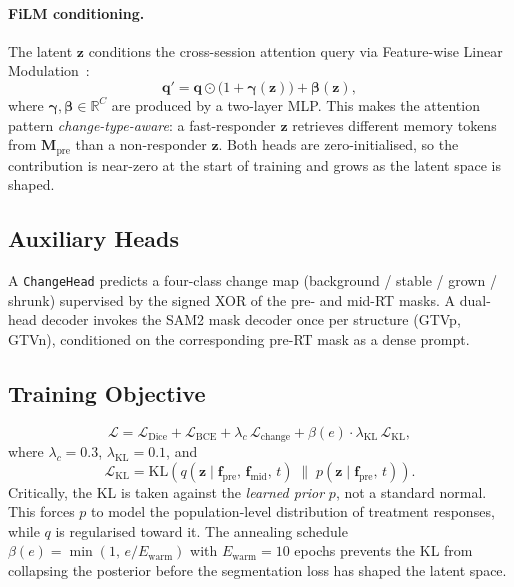 \paragraph{FiLM conditioning.}
The latent $\mathbf{z}$ conditions the cross-session attention query via
Feature-wise Linear Modulation~\cite{perez2018film}:
\begin{equation}
  \mathbf{q}' = \mathbf{q} \odot \bigl(1 + \boldsymbol{\gamma}(\mathbf{z})\bigr)
              + \boldsymbol{\beta}(\mathbf{z}),
\end{equation}
where $\boldsymbol{\gamma}, \boldsymbol{\beta} \in \mathbb{R}^C$ are produced
by a two-layer MLP.  This makes the attention pattern \emph{change-type-aware}:
a fast-responder $\mathbf{z}$ retrieves different memory tokens from
$\mathbf{M}_{\text{pre}}$ than a non-responder $\mathbf{z}$.  Both heads are
zero-initialised, so the contribution is near-zero at the start of training
and grows as the latent space is shaped.

\subsection{Auxiliary Heads}
\label{sec:method:auxiliary}

A \texttt{ChangeHead} predicts a four-class change map
(background / stable / grown / shrunk) supervised by the signed XOR of the
pre- and mid-RT masks.  A dual-head decoder invokes the SAM2 mask decoder
once per structure (GTVp, GTVn), conditioned on the corresponding pre-RT mask
as a dense prompt.

\subsection{Training Objective}
\label{sec:method:loss}

\begin{equation}
  \mathcal{L} =
    \mathcal{L}_{\text{Dice}} + \mathcal{L}_{\text{BCE}}
    + \lambda_c\, \mathcal{L}_{\text{change}}
    + \beta(e)\cdot\lambda_{\text{KL}}\, \mathcal{L}_{\text{KL}},
\end{equation}
where $\lambda_c = 0.3$, $\lambda_{\text{KL}} = 0.1$, and
\begin{equation}
  \mathcal{L}_{\text{KL}} = \mathrm{KL}\!\left(
    q(\mathbf{z} \mid \mathbf{f}_{\text{pre}},\, \mathbf{f}_{\text{mid}},\, t)
    \;\|\;
    p(\mathbf{z} \mid \mathbf{f}_{\text{pre}},\, t)
  \right).
\end{equation}
Critically, the KL is taken against the \emph{learned prior} $p$, not a
standard normal.  This forces $p$ to model the population-level distribution
of treatment responses, while $q$ is regularised toward it.  The annealing
schedule $\beta(e) = \min(1,\, e / E_{\text{warm}})$ with
$E_{\text{warm}} = 10$ epochs prevents the KL from collapsing the posterior
before the segmentation loss has shaped the latent space.

